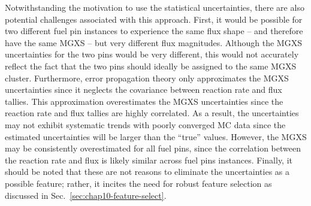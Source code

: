 Notwithstanding the motivation to use the statistical uncertainties, there are also potential challenges associated with this approach. First, it would be possible for two different fuel pin instances to experience the same flux shape -- and therefore have the same \ac{MGXS} -- but very different flux magnitudes. Although the \ac{MGXS} uncertainties for the two pins would be very different, this would not accurately reflect the fact that the two pins should ideally be assigned to the same \ac{MGXS} cluster. Furthermore, error propagation theory only approximates the \ac{MGXS} uncertainties since it neglects the covariance between reaction rate and flux tallies. This approximation overestimates the \ac{MGXS} uncertainties since the reaction rate and flux tallies are highly correlated. As a result, the uncertainties may not exhibit systematic trends with poorly converged \ac{MC} data since the estimated uncertainties will be larger than the ``true'' values. However, the \ac{MGXS} may be consistently overestimated for all fuel pins, since the correlation between the reaction rate and flux is likely similar across fuel pins instances. Finally, it should be noted that these are not reasons to eliminate the uncertainties as a possible feature; rather, it incites the need for robust feature selection as discussed in Sec.~\ref{sec:chap10-feature-select}.


